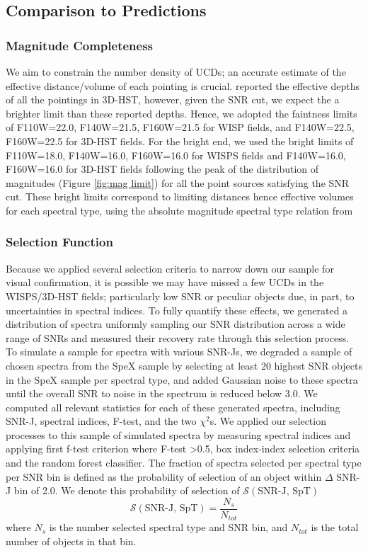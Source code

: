 \documentclass[manuscript]{aastex}
\begin{document}
\subsection{Comparison to Predictions}

\subsubsection{Magnitude Completeness}\label{mag_limits}

We aim to constrain the number density of UCDs; an accurate estimate of the effective distance/volume of each pointing is crucial.  \citealt{Momcheva2016} reported the effective depths of all the pointings in 3D-HST, however, given the SNR cut, we expect the a brighter limit than these reported depths. Hence, we adopted the faintness limits of F110W=22.0, F140W=21.5, F160W=21.5 for WISP fields, and  F140W=22.5, F160W=22.5 for 3D-HST fields. For the bright end, we used the bright limits of F110W=18.0, F140W=16.0, F160W=16.0 for WISPS fields and F140W=16.0, F160W=16.0 for 3D-HST fields following the peak of the distribution of magnitudes (Figure \ref{fig:mag limit}) for all the point sources satisfying the SNR cut. These bright limits correspond to limiting distances hence effective volumes for each spectral type, using the absolute magnitude spectral type relation from \citealt{2012ApJS..201...19D} 
\subsubsection{Selection Function}\label{selectionf}
Because we applied several selection criteria to narrow down our sample for visual confirmation, it is possible we may have missed a few UCDs in the WISPS/3D-HST fields; particularly low SNR or peculiar objects due, in part, to uncertainties in spectral indices. To fully quantify these effects, we generated a distribution of spectra uniformly sampling our SNR distribution across a wide range of SNRs and measured their recovery rate through this selection process. To simulate a sample for spectra with various SNR-Js, we degraded a sample of chosen spectra from the SpeX sample by selecting at least 20 highest SNR objects in the SpeX sample per spectral type, and added Gaussian noise to these spectra until the overall SNR to noise in the spectrum is reduced below 3.0. We computed all relevant statistics for each of these generated spectra, including SNR-J, spectral indices, F-test, and the two $\chi^2$s. We applied our selection processes to this sample of simulated spectra by measuring spectral indices and applying first f-test criterion where F-test \textgreater0.5, box index-index selection criteria and the random forest classifier. The fraction of spectra selected per spectral type per SNR bin is defined as the probability of selection of an object within $\Delta$ SNR-J bin of 2.0. We denote this probability of selection of $\mathcal{S}(\text{SNR-J, SpT})$
\begin{equation*}
\mathcal{S}(\text{SNR-J, SpT})= \frac{N_s}{N_{tot}}
\end{equation*} where $N_s$ is the number selected spectral type and SNR bin, and $N_{tot}$ is the total number of objects in that bin.
\end{document}
